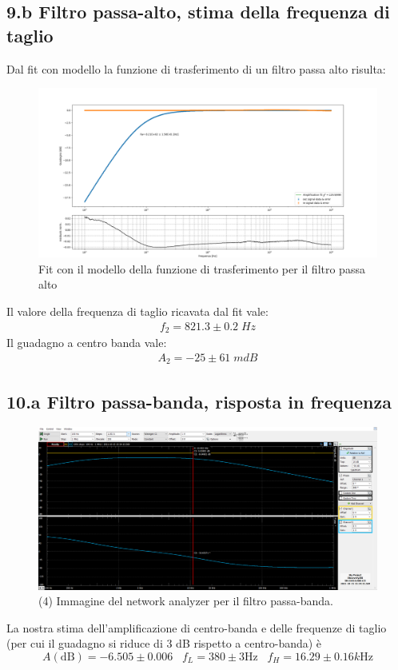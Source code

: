 \documentclass[10pt,a4paper]{article}
\begin{document}
\subsection*{9.b Filtro passa-alto, stima della frequenza di taglio}
Dal fit con modello la funzione di trasferimento di un filtro passa alto risulta:
\begin{figure}[H]
\centering
\includegraphics[scale=0.4]{passa_alto}
\caption{Fit con il modello della funzione di trasferimento per il filtro passa alto}
\end{figure}
Il valore della frequenza di taglio ricavata dal fit vale:
\begin{align*}
f_2 = 821.3 \pm 0.2 \; \si{Hz}
\end{align*}
Il guadagno a centro banda vale:
\begin{align*}
A_2 = -25 \pm 61 \; \si{mdB}
\end{align*}
\subsection*{10.a Filtro passa-banda, risposta in frequenza}
\begin{figure}[htb]
\centering
\includegraphics[scale=0.35]{passabanda}
\caption{(4) Immagine del network analyzer per il filtro passa-banda.}
\end{figure}
La nostra stima dell'amplificazione di centro-banda e delle frequenze di 
taglio (per cui il guadagno si riduce di 3 dB rispetto a centro-banda) \`e
\[
A(\mathrm{dB}) = -6.505 \pm 0.006 \;\;\; f_{L} = 380 \pm 3 \si{\Hz} \;\;\;
f_{H} = 16.29 \pm 0.16 \si{k\Hz}
\]
\end{document}
